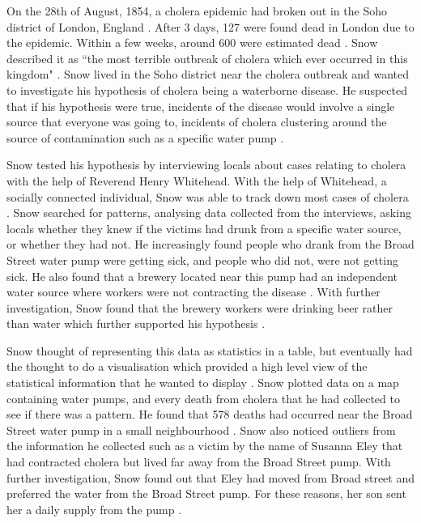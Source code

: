 \documentclass[12pt]{article}
\begin{document}
On the 28th of August, 1854, a cholera epidemic had broken out in the Soho district of London, England \cite{tedtalk}. After 3 days, 127 were found dead in London due to the epidemic. Within a few weeks, around 600 were estimated dead \cite{youtube, tedtalk}. Snow described it as ``the most terrible outbreak of cholera which ever occurred in this kingdom" \cite{ucla}. Snow lived in the Soho district near the cholera outbreak and wanted to investigate his hypothesis of cholera being a waterborne disease. He suspected that if his hypothesis were true, incidents of the disease would involve a single source that everyone was going to, incidents of cholera clustering around the source of contamination such as a specific water pump \cite{test, tedtalk, johnson}. 

Snow tested his hypothesis by interviewing locals about cases relating to cholera with the help of Reverend Henry Whitehead. With the help of Whitehead, a socially connected individual, Snow was able to track down most cases of cholera \cite{tedtalk}. Snow searched for patterns, analysing data collected from the interviews, asking locals whether they knew if the victims had drunk from a specific water source, or whether they had not. He increasingly found people who drank from the Broad Street water pump were getting sick, and people who did not, were not getting sick. He also found that a brewery located near this pump had an independent water source where workers were not contracting the disease \cite{blog}. With further investigation, Snow found that the brewery workers were drinking beer rather than water which further supported his hypothesis \cite{youtube}.

Snow thought of representing this data as statistics in a table, but eventually had the thought to do a visualisation which provided a high level view of the statistical information that he wanted to display \cite{tedtalk}. Snow plotted data on a map containing water pumps, and every death from cholera that he had collected to see if there was a pattern. He found that 578 deaths had occurred near the Broad Street water pump in a small neighbourhood \cite{channel1}. Snow also noticed outliers from the information he collected such as a victim by the name of Susanna Eley that had contracted cholera but lived far away from the Broad Street pump. With further investigation, Snow found out that Eley had moved from Broad street and preferred the water from the Broad Street pump. For these reasons, her son sent her a daily supply from the pump \cite{channel1}. 
\end{document}
